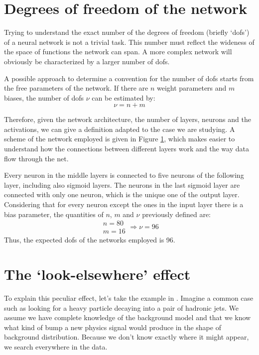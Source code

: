 \section{Degrees of freedom of the network}
Trying to understand the exact number of the degrees of freedom (briefly `dofs') of a neural network is not a trivial task. This number must reflect the wideness of the space of functions the network can span. A more complex network will obviously be characterized by a larger number of dofs.

A possible approach to determine a convention for the number of dofs starts from the free parameters of the network. If there are $n$ weight parameters and $m$ biases, the number of dofs $\nu$ can be estimated by:
\begin{equation}
	\nu = n + m
\end{equation}

Therefore, given the network architecture, the number of layers, neurons and the activations, we can give a definition adapted to the case we are studying. A scheme of the network employed is given in Figure \ref{fig:DOF}, which makes easier to understand how the connections between different layers work and the way data flow through the net.

\begin{figure}[H]
    \centering
    
    \label{fig:DOF}
\end{figure}

Every neuron in the middle layers is connected to five neurons of the following layer, including also sigmoid layers. The neurons in the last sigmoid layer are connected with only one neuron, which is the unique one of the output layer. Considering that for every neuron except the ones in the input layer there is a bias parameter, the quantities of $n$, $m$ and $\nu$ previously defined are:
\begin{equation}
	\begin{array}{l}
	n = 80\\
	m = 16
	\end{array}
	\Longrightarrow
	\nu = 96
\end{equation}
Thus, the expected dofs of the networks employed is 96.



\section{The `look-elsewhere' effect}
To explain this peculiar effect, let's take the example in \cite{look-elsewhere}. Imagine a common case such as looking for a heavy particle decaying into a pair of hadronic jets. We assume we have complete knowledge of the background model and that we know what kind of bump a new physics signal would produce in the shape of background distribution. Because we don't know exactly where it might appear, we search everywhere in the data.

